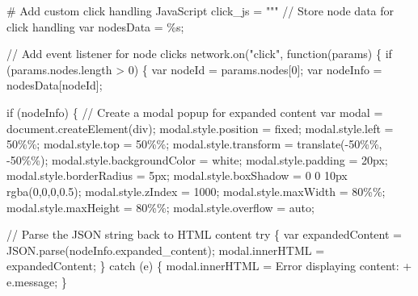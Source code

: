\documentclass[
  11pt,
  letterpaper,
]{book}
\newenvironment{Shaded}{\begin{snugshade}}{\end{snugshade}}
\newcommand{\CommentTok}[1]{\textcolor[rgb]{0.37,0.37,0.37}{#1}}
\newcommand{\NormalTok}[1]{\textcolor[rgb]{0.00,0.23,0.31}{#1}}
\newcommand{\OperatorTok}[1]{\textcolor[rgb]{0.37,0.37,0.37}{#1}}
\newcommand{\SpecialCharTok}[1]{\textcolor[rgb]{0.37,0.37,0.37}{#1}}
\newcommand{\StringTok}[1]{\textcolor[rgb]{0.13,0.47,0.30}{#1}}
\begin{document}
\begin{landscape}
\begin{Shaded}
\begin{Highlighting}[]
    \CommentTok{\# Add custom click handling JavaScript}
\NormalTok{    click\_js }\OperatorTok{=} \StringTok{"""}
\StringTok{    // Store node data for click handling}
\StringTok{    var nodesData = }\SpecialCharTok{\%s}\StringTok{;}

\StringTok{    // Add event listener for node clicks}
\StringTok{    network.on("click", function(params) \{}
\StringTok{        if (params.nodes.length \textgreater{} 0) \{}
\StringTok{            var nodeId = params.nodes[0];}
\StringTok{            var nodeInfo = nodesData[nodeId];}

\StringTok{            if (nodeInfo) \{}
\StringTok{                // Create a modal popup for expanded content}
\StringTok{                var modal = document.createElement(\textquotesingle{}div\textquotesingle{});}
\StringTok{                modal.style.position = \textquotesingle{}fixed\textquotesingle{};}
\StringTok{                modal.style.left = \textquotesingle{}50}\SpecialCharTok{\%\%}\StringTok{\textquotesingle{};}
\StringTok{                modal.style.top = \textquotesingle{}50}\SpecialCharTok{\%\%}\StringTok{\textquotesingle{};}
\StringTok{                modal.style.transform = \textquotesingle{}translate({-}50}\SpecialCharTok{\%\%}\StringTok{, {-}50}\SpecialCharTok{\%\%}\StringTok{)\textquotesingle{};}
\StringTok{                modal.style.backgroundColor = \textquotesingle{}white\textquotesingle{};}
\StringTok{                modal.style.padding = \textquotesingle{}20px\textquotesingle{};}
\StringTok{                modal.style.borderRadius = \textquotesingle{}5px\textquotesingle{};}
\StringTok{                modal.style.boxShadow = \textquotesingle{}0 0 10px rgba(0,0,0,0.5)\textquotesingle{};}
\StringTok{                modal.style.zIndex = \textquotesingle{}1000\textquotesingle{};}
\StringTok{                modal.style.maxWidth = \textquotesingle{}80}\SpecialCharTok{\%\%}\StringTok{\textquotesingle{};}
\StringTok{                modal.style.maxHeight = \textquotesingle{}80}\SpecialCharTok{\%\%}\StringTok{\textquotesingle{};}
\StringTok{                modal.style.overflow = \textquotesingle{}auto\textquotesingle{};}

\StringTok{                // Parse the JSON string back to HTML content}
\StringTok{                try \{}
\StringTok{                    var expandedContent = JSON.parse(nodeInfo.expanded\_content);}
\StringTok{                    modal.innerHTML = expandedContent;}
\StringTok{                \} catch (e) \{}
\StringTok{                    modal.innerHTML = \textquotesingle{}Error displaying content: \textquotesingle{} + e.message;}
\StringTok{                \}}


\end{Highlighting}
\end{Shaded}
\end{landscape}
\end{document}
